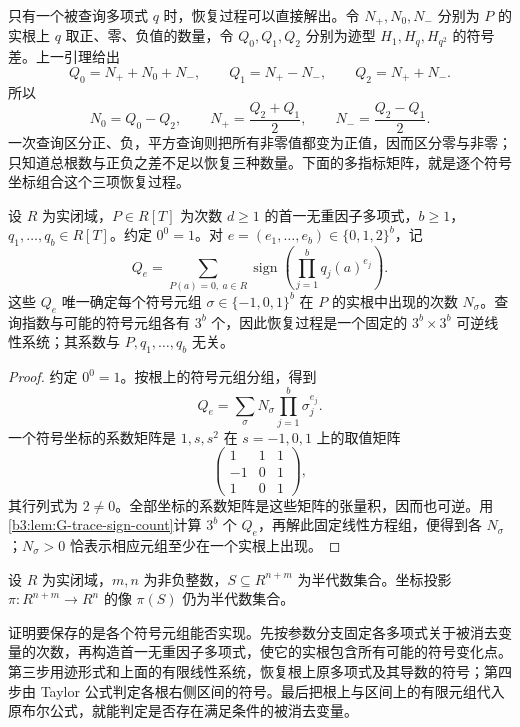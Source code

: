 \ProseParagraphBreak
只有一个被查询多项式 \(q\) 时，恢复过程可以直接解出。令 \(N_+,N_0,N_-\) 分别为 \(P\) 的实根上 \(q\) 取正、零、负值的数量，令 \(Q_0,Q_1,Q_2\) 分别为迹型 \(H_1,H_q,H_{q^2}\) 的符号差。上一引理给出
\[
	Q_0=N_++N_0+N_-,\qquad Q_1=N_+-N_-,\qquad Q_2=N_++N_-.
\]
所以
\[
	N_0=Q_0-Q_2,\qquad N_+=\frac{Q_2+Q_1}{2},\qquad N_-=\frac{Q_2-Q_1}{2}.
\]
一次查询区分正、负，平方查询则把所有非零值都变为正值，因而区分零与非零；只知道总根数与正负之差不足以恢复三种数量。下面的多指标矩阵，就是逐个符号坐标组合这个三项恢复过程。

\begin{lemma}[根上符号元组的恢复]\label{b3:lem:G-sign-tuple-recovery}
	设 \(R\) 为实闭域，\(P\in R[T]\) 为次数 \(d\ge1\) 的首一无重因子多项式，\(b\ge1\)，\(q_1,\ldots,q_b\in R[T]\)。约定 \(0^0=1\)。对 \(e=(e_1,\ldots,e_b)\in\{0,1,2\}^b\)，记
	\[
		Q_e=\sum_{P(a)=0,\ a\in R}\operatorname{sign} \left(\prod_{j=1}^b q_j(a)^{e_j}\right).
	\]
	这些 \(Q_e\) 唯一确定每个符号元组 \(\sigma\in\{-1,0,1\}^b\) 在 \(P\) 的实根中出现的次数 \(N_\sigma\)。查询指数与可能的符号元组各有 \(3^b\) 个，因此恢复过程是一个固定的 \(3^b\times3^b\) 可逆线性系统；其系数与 \(P,q_1,\ldots,q_b\) 无关。
\end{lemma}
\begin{proof}
	约定 \(0^0=1\)。按根上的符号元组分组，得到
	\[
		Q_e=\sum_\sigma N_\sigma\prod_{j=1}^b\sigma_j^{e_j}.
	\]
	一个符号坐标的系数矩阵是 \(1,s,s^2\) 在 \(s=-1,0,1\) 上的取值矩阵
	\[
		\begin{pmatrix}1&1&1\\-1&0&1\\1&0&1\end{pmatrix},
	\]
	其行列式为 \(2\ne0\)。全部坐标的系数矩阵是这些矩阵的张量积，因而也可逆。用\cref{b3:lem:G-trace-sign-count}计算 \(3^b\) 个 \(Q_e\)，再解此固定线性方程组，便得到各 \(N_\sigma\)；\(N_\sigma>0\) 恰表示相应元组至少在一个实根上出现。
\end{proof}

\begin{theorem}\label{b3:thm:real-projection}
	设 \(R\) 为实闭域，\(m,n\) 为非负整数，\(S\subseteq R^{n+m}\) 为半代数集合。坐标投影 \(\pi:R^{n+m}\to R^n\) 的像 \(\pi(S)\) 仍为半代数集合。
\end{theorem}

证明要保存的是各个符号元组能否实现。先按参数分支固定各多项式关于被消去变量的次数，再构造首一无重因子多项式，使它的实根包含所有可能的符号变化点。第三步用迹形式和上面的有限线性系统，恢复根上原多项式及其导数的符号；第四步由 Taylor 公式判定各根右侧区间的符号。最后把根上与区间上的有限元组代入原布尔公式，就能判定是否存在满足条件的被消去变量。

